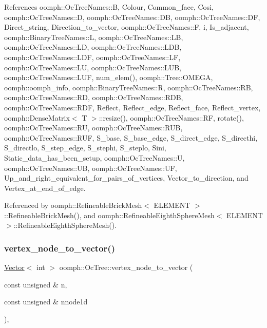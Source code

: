 References oomph\+::\+Oc\+Tree\+Names\+::B, Colour, Common\+\_\+face, Cosi, oomph\+::\+Oc\+Tree\+Names\+::D, oomph\+::\+Oc\+Tree\+Names\+::\+DB, oomph\+::\+Oc\+Tree\+Names\+::\+DF, Direct\+\_\+string, Direction\+\_\+to\+\_\+vector, oomph\+::\+Oc\+Tree\+Names\+::F, i, Is\+\_\+adjacent, oomph\+::\+Binary\+Tree\+Names\+::L, oomph\+::\+Oc\+Tree\+Names\+::\+LB, oomph\+::\+Oc\+Tree\+Names\+::\+LD, oomph\+::\+Oc\+Tree\+Names\+::\+L\+DB, oomph\+::\+Oc\+Tree\+Names\+::\+L\+DF, oomph\+::\+Oc\+Tree\+Names\+::\+LF, oomph\+::\+Oc\+Tree\+Names\+::\+LU, oomph\+::\+Oc\+Tree\+Names\+::\+L\+UB, oomph\+::\+Oc\+Tree\+Names\+::\+L\+UF, num\+\_\+elem(), oomph\+::\+Tree\+::\+O\+M\+E\+GA, oomph\+::oomph\+\_\+info, oomph\+::\+Binary\+Tree\+Names\+::R, oomph\+::\+Oc\+Tree\+Names\+::\+RB, oomph\+::\+Oc\+Tree\+Names\+::\+RD, oomph\+::\+Oc\+Tree\+Names\+::\+R\+DB, oomph\+::\+Oc\+Tree\+Names\+::\+R\+DF, Reflect, Reflect\+\_\+edge, Reflect\+\_\+face, Reflect\+\_\+vertex, oomph\+::\+Dense\+Matrix$<$ T $>$\+::resize(), oomph\+::\+Oc\+Tree\+Names\+::\+RF, rotate(), oomph\+::\+Oc\+Tree\+Names\+::\+RU, oomph\+::\+Oc\+Tree\+Names\+::\+R\+UB, oomph\+::\+Oc\+Tree\+Names\+::\+R\+UF, S\+\_\+base, S\+\_\+base\+\_\+edge, S\+\_\+direct\+\_\+edge, S\+\_\+directhi, S\+\_\+directlo, S\+\_\+step\+\_\+edge, S\+\_\+stephi, S\+\_\+steplo, Sini, Static\+\_\+data\+\_\+has\+\_\+been\+\_\+setup, oomph\+::\+Oc\+Tree\+Names\+::U, oomph\+::\+Oc\+Tree\+Names\+::\+UB, oomph\+::\+Oc\+Tree\+Names\+::\+UF, Up\+\_\+and\+\_\+right\+\_\+equivalent\+\_\+for\+\_\+pairs\+\_\+of\+\_\+vertices, Vector\+\_\+to\+\_\+direction, and Vertex\+\_\+at\+\_\+end\+\_\+of\+\_\+edge.



Referenced by oomph\+::\+Refineable\+Brick\+Mesh$<$ E\+L\+E\+M\+E\+N\+T $>$\+::\+Refineable\+Brick\+Mesh(), and oomph\+::\+Refineable\+Eighth\+Sphere\+Mesh$<$ E\+L\+E\+M\+E\+N\+T $>$\+::\+Refineable\+Eighth\+Sphere\+Mesh().

\mbox{\label{classoomph_1_1OcTree_a6f2dfb7f1527f77cf2900eecef279ee0}} 
\subsubsection{\texorpdfstring{vertex\+\_\+node\+\_\+to\+\_\+vector()}{vertex\_node\_to\_vector()}}
{\footnotesize\ttfamily \hyperlink{classoomph_1_1Vector}{Vector}$<$ int $>$ oomph\+::\+Oc\+Tree\+::vertex\+\_\+node\+\_\+to\+\_\+vector (\begin{DoxyParamCaption}\item[{const unsigned \&}]{n,  }\item[{const unsigned \&}]{nnode1d }\end{DoxyParamCaption})\hspace{0.3cm}{\ttfamily [static]}, {\ttfamily [private]}}



